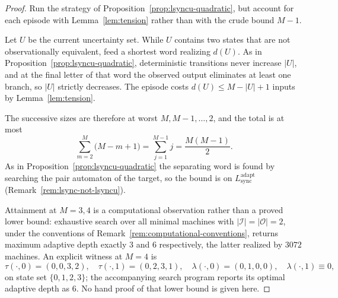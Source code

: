 \documentclass[12pt]{article}
\theoremstyle{definition}
\newcommand{\Lsync}{L_{\mathrm{sync}}^{\mathrm{adapt}}}
\begin{document}
\begin{proof}
Run the strategy of Proposition~\ref{prop:lsyncu-quadratic}, but account for
each episode with Lemma~\ref{lem:tension} rather than with the crude bound
$M-1$.

Let $U$ be the current uncertainty set.  While $U$ contains two states that
are not observationally equivalent, feed a shortest word realizing $d(U)$.  As
in Proposition~\ref{prop:lsyncu-quadratic}, deterministic transitions never
increase $|U|$, and at the final letter of that word the observed output
eliminates at least one branch, so $|U|$ strictly decreases.  The episode costs
$d(U)\le M-|U|+1$ inputs by Lemma~\ref{lem:tension}.

The successive sizes are therefore at worst $M,M-1,\dots,2$, and the total is
at most
\[
\sum_{m=2}^{M}\bigl(M-m+1\bigr)
=
\sum_{j=1}^{M-1}j
=
\frac{M(M-1)}{2}.
\]
As in Proposition~\ref{prop:lsyncu-quadratic} the separating word is found by
searching the pair automaton of the target, so the bound is on $\Lsync$
(Remark~\ref{rem:lsync-not-lsyncu}).

Attainment at $M=3,4$ is a computational observation rather than a proved
lower bound: exhaustive search over all minimal machines with
$|\mathcal I|=|\mathcal O|=2$, under the conventions of
Remark~\ref{rem:computational-conventions}, returns maximum adaptive depth
exactly $3$ and $6$ respectively, the latter realized by $3072$ machines.  An explicit witness
at $M=4$ is
\[
\tau(\cdot,0)=(0,0,3,2),\quad
\tau(\cdot,1)=(0,2,3,1),\quad
\lambda(\cdot,0)=(0,1,0,0),\quad
\lambda(\cdot,1)\equiv0 ,
\]
on state set $\{0,1,2,3\}$; the accompanying search program reports its optimal
adaptive depth as $6$.  No hand proof of that lower bound is given here.
\end{proof}
\end{document}
